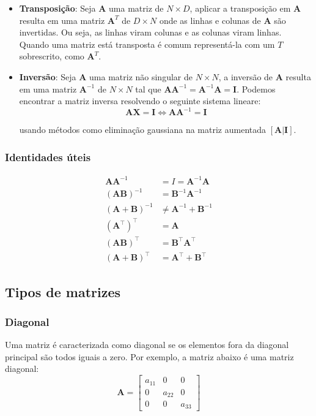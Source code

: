 \begin{itemize}
    \item \textbf{Transposição}: Seja $\mathbf{A}$ uma matriz de $N \times D$, aplicar a transposição em $\mathbf{A}$ resulta em uma matriz $\mathbf{A}^T$ de $D \times N$ onde as linhas e colunas de $\mathbf{A}$ são invertidas. Ou seja, as linhas viram colunas e as colunas viram linhas. Quando uma matriz está transposta é comum representá-la com um $T$ sobrescrito, como $\mathbf{A}^T$.
    
    \item \textbf{Inversão}: Seja $\mathbf{A}$ uma matriz não singular de $N \times N$, a inversão de $\mathbf{A}$ resulta em uma matriz $\mathbf{A}^{-1}$ de $N \times N$ tal que $\mathbf{AA}^{-1} = \mathbf{A}^{-1}\mathbf{A} = \mathbf{I}$. Podemos encontrar a matriz inversa resolvendo o seguinte sistema lineare:
    \[
        \mathbf{A}\mathbf{X} = \mathbf{I} \Leftrightarrow  \mathbf{A}\mathbf{A}^{-1} = \mathbf{I}
    \]

    usando métodos como eliminação gaussiana na matriz aumentada $[\mathbf{A} | \mathbf{I}]$.

\end{itemize}

\subsubsection{Identidades úteis}

\[
    \begin{aligned}
        \mathbf{A}\mathbf{A}^{-1} &= I = \mathbf{A}^{-1}\mathbf{A} \\
        (\mathbf{AB})^{-1} &= \mathbf{B}^{-1}\mathbf{A}^{-1} \\
        (\mathbf{A} + \mathbf{B})^{-1} &\neq \mathbf{A}^{-1} + \mathbf{B}^{-1} \\
        (\mathbf{A}^\top)^\top &= \mathbf{A} \\
        (\mathbf{AB})^\top &= \mathbf{B}^\top \mathbf{A}^\top \\
        (\mathbf{A} + \mathbf{B})^\top &= \mathbf{A}^\top + \mathbf{B}^\top
    \end{aligned}
\]

\subsection{Tipos de matrizes}

\subsubsection{Diagonal}
Uma matriz é caracterizada como diagonal se os elementos fora da diagonal principal são todos iguais a zero. Por exemplo, a matriz abaixo é uma matriz diagonal:
\[
    \mathbf{A} = 
    \begin{bmatrix}
        a_{11} & 0 & 0 \\
        0 & a_{22} & 0 \\
        0 & 0 & a_{33}
    \end{bmatrix}
\]
